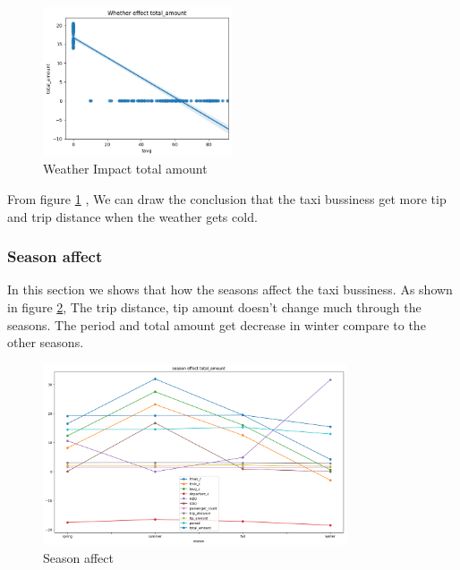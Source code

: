 \documentclass[11pt]{article}
\begin{document}
\begin{figure}[!h]
    \centering
    \includegraphics[width=0.5\textwidth]{plots/p8.png}
    \caption{Weather Impact total amount} %
    \label{fig:image3}
\end{figure}

From ﬁgure \ref{fig:image3} , We can draw the conclusion that the taxi bussiness get more tip and trip distance when the weather gets cold.

\subsubsection{Season affect}
In this section we shows that how the seasons affect the taxi bussiness. 
As shown in figure \ref{fig:image4}, The trip distance, tip amount doesn't change much through the seasons. The period and total amount get decrease in winter compare to the other seasons. 

\begin{figure}[!h]
    \centering
    \includegraphics[width=0.8\textwidth]{plots/p9.png}
    \caption{Season affect} %
    \label{fig:image4}
\end{figure}
\end{document}
